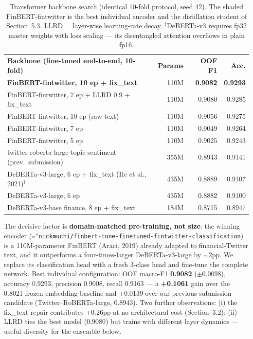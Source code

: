 \documentclass[11pt,a4paper]{article}
\newcommand{\tH}[1]{\textcolor{maincolor}{\textbf{#1}}}
\newcommand{\gmid}{\arrayrulecolor{maincolor}\midrule\arrayrulecolor{black}}
\newcommand{\ttt}[1]{\texttt{\hyphenchar\font=`\-\relax #1}}
\begin{document}
\begin{table}[H]
  \centering
  \footnotesize
  \setlength{\tabcolsep}{5pt}
  \begin{tabularx}{\linewidth}{@{}>{\raggedright\arraybackslash}X r r r@{}}
    \toprule
    \tH{Backbone (fine-tuned end-to-end, 10-fold)} & \tH{Params} & \tH{OOF F1} & \tH{Acc.} \\
    \gmid
    \rowcolor{lightgray} \textbf{FinBERT-fintwitter, 10 ep + fix\_text} & 110M & \textbf{0.9082} & \textbf{0.9293} \\
    FinBERT-fintwitter, 7 ep + LLRD 0.9 + fix\_text         & 110M & 0.9080 & 0.9285 \\
    FinBERT-fintwitter, 10 ep (raw text)                    & 110M & 0.9056 & 0.9275 \\
    FinBERT-fintwitter, 7 ep                                & 110M & 0.9049 & 0.9264 \\
    FinBERT-fintwitter, 5 ep                                & 110M & 0.9025 & 0.9243 \\
    twitter-roberta-large-topic-sentiment (prev.\ submission) & 355M & 0.8943 & 0.9141 \\
    DeBERTa-v3-large, 6 ep + fix\_text (He et al., 2021)$^\dagger$ & 435M & 0.8889 & 0.9107 \\
    DeBERTa-v3-large, 6 ep                                  & 435M & 0.8882 & 0.9100 \\
    DeBERTa-v3-base finance, 8 ep + fix\_text               & 184M & 0.8715 & 0.8947 \\
    \bottomrule
  \end{tabularx}
  \caption{Transformer backbone search (identical 10-fold protocol, seed 42). The shaded
  FinBERT-fintwitter is the best individual encoder and the distillation student of Section~5.3.
  LLRD = layer-wise learning-rate decay. $^\dagger$DeBERTa-v3 requires fp32 master weights with
  loss scaling --- its disentangled attention overflows in plain fp16.}
  \label{tab:backbones}
\end{table}

The decisive factor is \textbf{domain-matched pre-training, not size}: the winning encoder
(\ttt{nickmuchi/finbert-tone-finetuned-fintwitter-classification}) is a 110M-parameter FinBERT
(Araci, 2019) already adapted to financial-Twitter text, and it outperforms a four-times-larger
DeBERTa-v3-large by $\sim$2pp. We replace its classification head with a fresh 3-class head and
fine-tune the complete network. Best individual configuration: OOF macro-F1 \textbf{0.9082}
($\pm$0.0098), accuracy 0.9293, precision 0.9008, recall 0.9163 --- a \textbf{+0.1061} gain over
the 0.8021 frozen-embedding baseline and +0.0139 over our previous submission candidate
(Twitter--RoBERTa-large, 0.8943). Two further observations: (i) the fix\_text repair contributes
+0.26pp at no architectural cost (Section~3.2); (ii) LLRD ties the best model (0.9080) but trains
with different layer dynamics --- useful diversity for the ensemble below.
\end{document}
